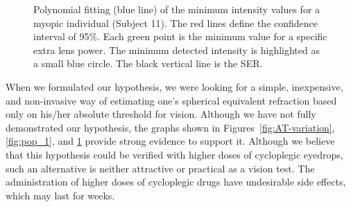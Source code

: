 \begin{figure}[!t]
	\centering
	
	
	
	\caption[Polynomial fitting of the absolute threshold values of Subject 11]{Polynomial fitting (blue line) of the minimum intensity values for a myopic individual (Subject 11). The red lines define the confidence interval of 95\%. Each green point is the minimum value for a specific extra lens power. The minimum detected intensity is highlighted as a small blue circle. The black vertical line is the SER.}
	\label{fig:pop_11}
\end{figure}

When we formulated our hypothesis, we were looking for a simple, inexpensive, and non-invasive way of estimating one's spherical equivalent refraction based only on his/her absolute threshold for vision. 
Although we have not fully demonstrated our hypothesis, the graphs shown in Figures~\ref{fig:AT-variation}, \ref{fig:pop_1}, and \ref{fig:pop_11} provide strong evidence to support it. Although we believe that this hypothesis could be verified with higher doses of cycloplegic eyedrops, such an alternative is neither attractive or practical as a vision test. The administration of higher doses of cycloplegic drugs have undesirable side effects, which may last for weeks.  
 
